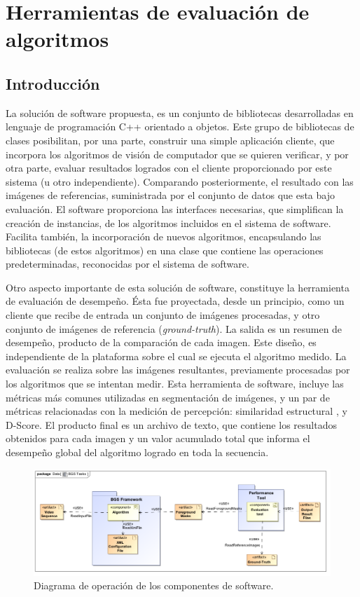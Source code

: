 \chapter{Herramientas de evaluación de algoritmos}

\section{Introducción}
La solución de software propuesta, es un conjunto de bibliotecas desarrolladas en lenguaje de programación C++ orientado a objetos. Este grupo de bibliotecas de clases posibilitan, por una parte, construir una simple aplicación cliente, que incorpora los algoritmos de visión de computador que se quieren verificar, y por otra parte, evaluar resultados logrados con el cliente proporcionado por este sistema (u otro independiente). Comparando posteriormente, el resultado con las imágenes de referencias, suministrada por el conjunto de datos que esta bajo evaluación. El software proporciona las interfaces necesarias, que simplifican la creación de instancias, de los algoritmos incluidos en el sistema de software. Facilita también, la incorporación de nuevos algoritmos, encapsulando las bibliotecas (de estos algoritmos) en una clase que contiene las operaciones predeterminadas, reconocidas por el sistema de software. 

Otro aspecto importante de esta solución de software, constituye la herramienta de evaluación de desempeño. Ésta fue proyectada, desde un principio, como un cliente que recibe de entrada un conjunto de imágenes procesadas, y otro conjunto de imágenes de referencia (\textit{ground-truth}). La salida es un resumen de desempeño, producto de la comparación de cada imagen. Este diseño, es independiente de la plataforma sobre el cual se ejecuta el algoritmo medido. La evaluación se realiza sobre las imágenes resultantes, previamente procesadas por los algoritmos que se intentan medir. Esta herramienta de software, incluye las métricas más comunes utilizadas en segmentación de imágenes, y un par de métricas relacionadas con la medición de percepción: similaridad estructural \cite{park_benchmark_2013, wang_image_2004}, y D-Score\cite{lallier_testing_2011}. El producto final es un archivo de texto, que contiene los resultados obtenidos para cada imagen y un valor acumulado total que informa el desempeño global del algoritmo logrado en toda la secuencia.


\begin{figure}[h!]
\centering
\includegraphics[scale=0.5]{img/BGS_Tasks}
\caption[Diagrama de componentes]{Diagrama de operación de los componentes de software.}
\label{fig:bgs_tasks}
\end{figure}



